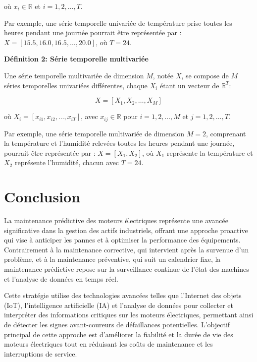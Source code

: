 où $x_i \in \mathbb{R}$ et $i = 1, 2, \ldots, T$.

Par exemple, une série temporelle univariée de température prise toutes les
heures pendant une journée pourrait être représentée par : $X = [15.5, 16.0,
	16.5, \ldots, 20.0]$, où $T = 24$.

\textbf{Définition 2: Série temporelle multivariée}

Une série temporelle multivariée de dimension $M$, notée $X$, se compose de $M$
séries temporelles univariées différentes, chaque $X_i$ étant un vecteur de
$\mathbb{R}^T$:

\begin{equation}
	X = [X_1, X_2, \ldots, X_M]
\end{equation}

où $X_i = [x_{i1}, x_{i2}, \ldots, x_{iT}]$, avec $x_{ij} \in \mathbb{R}$ pour
$i = 1, 2, \ldots, M$ et $j = 1, 2, \ldots, T$.

Par exemple, une série temporelle multivariée de dimension $M=2$, comprenant la
température et l'humidité relevées toutes les heures pendant une journée,
pourrait être représentée par : $X = [X_1, X_2]$, où $X_1$ représente la
température et $X_2$ représente l'humidité, chacun avec $T = 24$.

\section{Conclusion}

La maintenance prédictive des moteurs électriques représente une avancée
significative dans la gestion des actifs industriels, offrant une approche
proactive qui vise à anticiper les pannes et à optimiser la performance des
équipements. Contrairement à la maintenance corrective, qui intervient après la
survenue d’un problème, et à la maintenance préventive, qui suit un calendrier
fixe, la maintenance prédictive repose sur la surveillance continue de l’état
des machines et l’analyse de données en temps réel.

Cette stratégie utilise des technologies avancées telles que l'Internet des
objets (IoT), l'intelligence artificielle (IA) et l'analyse de données pour
collecter et interpréter des informations critiques sur les moteurs
électriques, permettant ainsi de détecter les signes avant-coureurs de
défaillances potentielles. L’objectif principal de cette approche est
d’améliorer la fiabilité et la durée de vie des moteurs électriques tout en
réduisant les coûts de maintenance et les interruptions de service.


